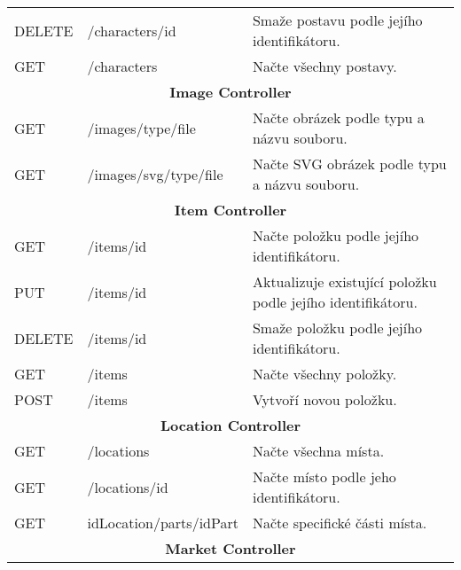 \begin{longtable}{|l|l|p{}|}
    DELETE          & /characters/{id}            & Smaže postavu podle jejího identifikátoru.                          \\
    GET             & /characters                 & Načte všechny postavy.                                              \\
    \hline
    \multicolumn{3}{|c|}{\textbf{Image Controller}}                                                                     \\
    \hline
    GET             & /images/{type}/{file}       & Načte obrázek podle typu a názvu souboru.                           \\
    GET             & /images/svg/{type}/{file}   & Načte SVG obrázek podle typu a názvu souboru.                       \\
    \hline
    \multicolumn{3}{|c|}{\textbf{Item Controller}}                                                                      \\
    \hline
    GET             & /items/{id}                 & Načte položku podle jejího identifikátoru.                          \\
    PUT             & /items/{id}                 & Aktualizuje existující položku podle jejího identifikátoru.         \\
    DELETE          & /items/{id}                 & Smaže položku podle jejího identifikátoru.                          \\
    GET             & /items                      & Načte všechny položky.                                              \\
    POST            & /items                      & Vytvoří novou položku.                                              \\
    \hline
    \multicolumn{3}{|c|}{\textbf{Location Controller}}                                                                  \\
    \hline
    GET             & /locations                  & Načte všechna místa.                                                \\
    GET             & /locations/{id}             & Načte místo podle jeho identifikátoru.                              \\
    GET             & {idLocation}/parts/{idPart} & Načte specifické části místa.                                       \\%
    \hline
    \multicolumn{3}{|c|}{\textbf{Market Controller}}                                                                    \\

\end{longtable}
